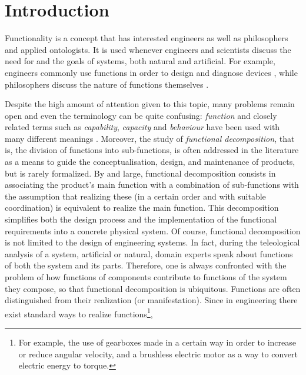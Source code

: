 \documentclass[sw]{iosart2x}
\newcommand{\firstTimeKeyWord}[1]{\textit{#1}}
\begin{document}
\section{Introduction}\label{sec:intro}

Functionality is a concept that has interested engineers as well as philosophers and applied ontologists. 
It is used whenever engineers and scientists discuss the need for and the goals of systems, both natural and artificial. 
For example, engineers commonly use functions in order to design \cite{pahl_engineering_2007} and diagnose devices \cite{larssonDiagnosisBasedExplicit1996}, while philosophers discuss the nature of functions themselves \cite{cumminsFunctionalAnalysis1975}.

Despite the high amount of attention given to this topic, many problems remain open \cite{artigaNewPerspectiveOnFunctions} and even the terminology can be quite confusing: \firstTimeKeyWord{function} and closely related terms such as \firstTimeKeyWord{capability}, \firstTimeKeyWord{capacity} and \firstTimeKeyWord{behaviour} have been used with many different meanings \cite{borgoCapabilitiesCapacitiesFunctionalities2021, erdenReviewFunctionModeling2008}. 
Moreover, the study of \firstTimeKeyWord{functional decomposition}, that is, the division of functions into sub-functions, is often addressed in the literature as a means to guide the conceptualisation, design, and maintenance of products, but is rarely formalized.
By and large, functional decomposition consists in associating the product's main function with a combination of sub-functions with the assumption that realizing these (in a certain order and with suitable coordination) is equivalent to realize the main function. This decomposition simplifies both the design process and the implementation of the functional requirements into a concrete physical system.
Of course, functional decomposition is not limited to the design of engineering systems. 
In fact, during the teleological analysis of a system, artificial or natural, domain experts speak about functions of both the system and its parts.
Therefore, one is always confronted with the problem of how functions of components contribute to functions of the system they compose, so that functional decomposition is ubiquitous. 
Functions are often distinguished from their realization (or manifestation). Since in engineering there exist standard ways to realize functions\footnote{For example, the use of gearboxes made in a certain way in order to increase or reduce angular velocity, and  a brushless electric motor  as a way to convert electric energy to torque.}, 
\end{document}
